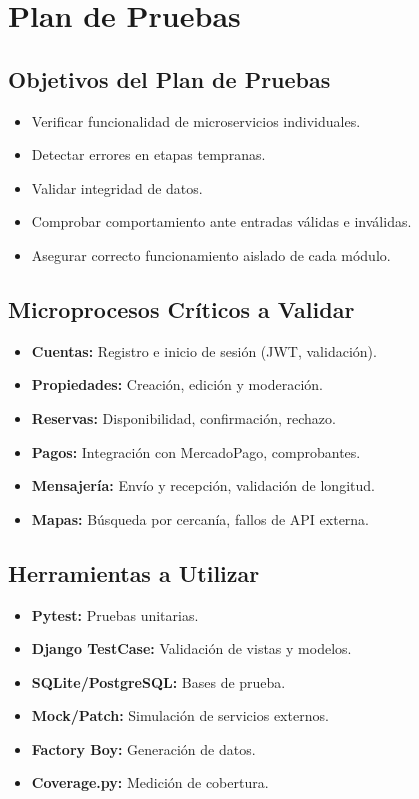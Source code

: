 \section{Plan de Pruebas}
	\subsection*{Objetivos del Plan de Pruebas}
	\begin{itemize}
		\item Verificar funcionalidad de microservicios individuales.
		\item Detectar errores en etapas tempranas.
		\item Validar integridad de datos.
		\item Comprobar comportamiento ante entradas válidas e inválidas.
		\item Asegurar correcto funcionamiento aislado de cada módulo.
	\end{itemize}
	
	\subsection*{Microprocesos Críticos a Validar}
	\begin{itemize}
		\item \textbf{Cuentas:} Registro e inicio de sesión (JWT, validación).
		\item \textbf{Propiedades:} Creación, edición y moderación.
		\item \textbf{Reservas:} Disponibilidad, confirmación, rechazo.
		\item \textbf{Pagos:} Integración con MercadoPago, comprobantes.
		\item \textbf{Mensajería:} Envío y recepción, validación de longitud.
		\item \textbf{Mapas:} Búsqueda por cercanía, fallos de API externa.
	\end{itemize}
	
	\subsection*{Herramientas a Utilizar}
	\begin{itemize}
		\item \textbf{Pytest:} Pruebas unitarias.
		\item \textbf{Django TestCase:} Validación de vistas y modelos.
		\item \textbf{SQLite/PostgreSQL:} Bases de prueba.
		\item \textbf{Mock/Patch:} Simulación de servicios externos.
		\item \textbf{Factory Boy:} Generación de datos.
		\item \textbf{Coverage.py:} Medición de cobertura.
	\end{itemize}
	
